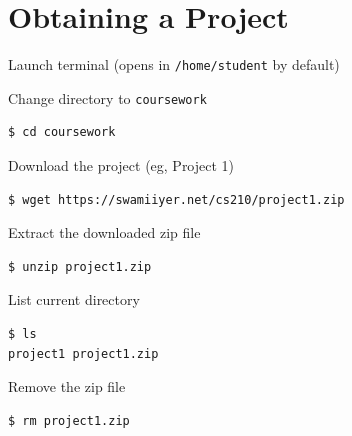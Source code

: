 \documentclass[8pt,a4paper,compress]{beamer}
\begin{document}
\section{Obtaining a Project}
\begin{frame}[fragile]
\pause\transdissolve

Launch terminal (opens in \lstinline{/home/student} by default)

\pause\transdissolve\bigskip

Change directory to \lstinline{coursework}

\begin{tcolorbox}[enhanced,drop shadow southwest,sharp corners,size=fbox,colback=black]
\begin{lstlisting}[style=terminal]
$ cd coursework
\end{lstlisting}
\end{tcolorbox}

\pause\transdissolve\bigskip

Download the project (eg, Project 1)

\begin{tcolorbox}[enhanced,drop shadow southwest,sharp corners,size=fbox,colback=black]
\begin{lstlisting}[style=terminal]
$ wget https://swamiiyer.net/cs210/project1.zip
\end{lstlisting}
\end{tcolorbox}

\pause\transdissolve\bigskip

Extract the downloaded zip file

\begin{tcolorbox}[enhanced,drop shadow southwest,sharp corners,size=fbox,colback=black]
\begin{lstlisting}[style=terminal]
$ unzip project1.zip
\end{lstlisting}
\end{tcolorbox}

\pause\transdissolve\bigskip

List current directory

\begin{tcolorbox}[enhanced,drop shadow southwest,sharp corners,size=fbox,colback=black]
\begin{lstlisting}[style=terminal]
$ ls
project1 project1.zip
\end{lstlisting}
\end{tcolorbox}

\pause\transdissolve\bigskip

Remove the zip file

\begin{tcolorbox}[enhanced,drop shadow southwest,sharp corners,size=fbox,colback=black]
\begin{lstlisting}[style=terminal]
$ rm project1.zip
\end{lstlisting}
\end{tcolorbox}
\end{frame}
\end{document}
